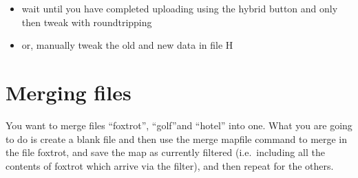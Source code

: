 \documentclass[
]{book}
\providecommand{\tightlist}{%
  \setlength{\itemsep}{0pt}\setlength{\parskip}{0pt}}
\begin{document}
\begin{itemize}
\tightlist
\item
  wait until you have completed uploading using the hybrid button and only then tweak with roundtripping
\item
  or, manually tweak the old and new data in file H
\end{itemize}

\hypertarget{xmerging-files}{%
\chapter{Merging files}\label{xmerging-files}}

You want to merge files ``foxtrot'', ``golf''and ``hotel'' into one. What you are going to do is create a blank file and then use the merge mapfile command to merge in the file foxtrot, and save the map as currently filtered (i.e.~including all the contents of foxtrot which arrive via the filter), and then repeat for the others.
\end{document}
